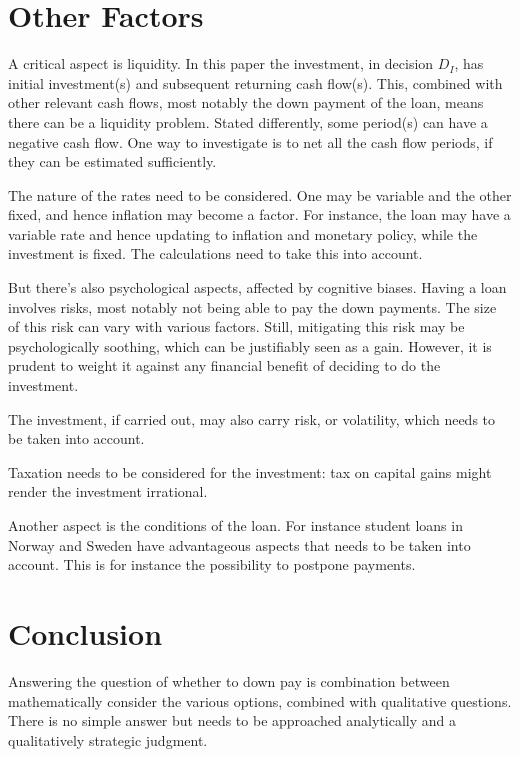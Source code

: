 \documentclass[a4paper]{article}
\begin{document}
\section{Other Factors}

A critical aspect is liquidity. In this paper the investment, in decision $D_I$,
has initial investment(s) and subsequent returning cash flow(s). This, combined
with other relevant cash flows, most notably the down payment of the loan, means
there can be a liquidity problem. Stated differently, some period(s) can have a
negative cash flow. One way to investigate is to net all the cash flow periods,
if they can be estimated sufficiently.

The nature of the rates need to be considered. One may be variable and the other
fixed, and hence inflation may become a factor. For instance, the loan may have
a variable rate and hence updating to inflation and monetary policy, while the
investment is fixed. The calculations need to take this into account.

But there's also psychological aspects, affected by cognitive biases. Having a
loan involves risks, most notably not being able to pay the down payments. The
size of this risk can vary with various factors. Still, mitigating this risk may
be psychologically soothing, which can be justifiably seen as a gain. However,
it is prudent to weight it against any financial benefit of deciding to do the
investment.

The investment, if carried out, may also carry risk, or volatility, which needs
to be taken into account.

Taxation needs to be considered for the investment: tax on capital gains might
render the investment irrational.

Another aspect is the conditions of the loan. For instance student loans in
Norway and Sweden have advantageous aspects that needs to be taken into account.
This is for instance the possibility to postpone payments.

\section{Conclusion}

Answering the question of whether to down pay is combination between
mathematically consider the various options, combined with qualitative
questions. There is no simple answer but needs to be approached analytically
and a qualitatively strategic judgment.
\end{document}
